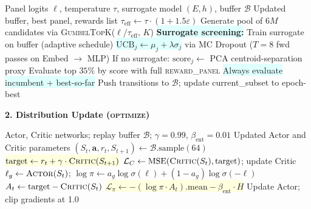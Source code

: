 \documentclass[8pt]{article}
\begin{document}
\begin{tcolorbox}[
    title={\textbf{Algorithm 1c:} Optimize Best --- Gumbel-TopK + neural surrogate racing},
    colback=lightcyan!30, colframe=addedB!70, fonttitle=\small\bfseries,
    boxrule=0.5pt, arc=2pt, left=4pt, right=4pt, top=2pt, bottom=2pt
]
\begin{algorithmic}[1]
\small
\Require Panel logits $\boldsymbol{\ell}$, temperature $\tau$, surrogate model $(E, h)$, buffer $\mathcal{B}$
\Ensure Updated buffer, best panel, rewards list
\State $\tau_\text{eff} \gets \tau \cdot (1 + 1.5\varepsilon)$ 
\State Generate pool of $6M$ candidates via \textsc{GumbelTopK}($\boldsymbol{\ell}/\tau_\text{eff}$, $K$)
\State \colorbox{lightcyan}{\textbf{Surrogate screening:}} Train surrogate on buffer (adaptive schedule)
\State \colorbox{lightcyan}{$\text{UCB}_j \gets \mu_j + \lambda\sigma_j$} via MC Dropout ($T{=}8$ fwd passes on Embed $\to$ MLP)
\State If no surrogate: $\text{score}_j \gets$ PCA centroid-separation proxy
\State Evaluate top $35\%$ by score with full \textsc{reward\_panel}
\State \colorbox{lightcyan}{Always evaluate incumbent + best-so-far} 
\State Push transitions to $\mathcal{B}$; update current\_subset to epoch-best
\end{algorithmic}
\end{tcolorbox}

\newpage

{\large\bfseries 2. Distribution Update (\textsc{optimize})}

\vspace{3pt}

\begin{tcolorbox}[
    title={\textbf{Algorithm 2a:} Original RL --- Actor-Critic policy gradient + TD(0)},
    colback=white, colframe=black!60, fonttitle=\small\bfseries,
    boxrule=0.5pt, arc=2pt, left=4pt, right=4pt, top=2pt, bottom=2pt
]
\begin{algorithmic}[1]
\small
\Require Actor, Critic networks; replay buffer $\mathcal{B}$; $\gamma = 0.99$, $\beta_\text{ent} = 0.01$
\Ensure Updated Actor and Critic parameters
    \State $(S_t, \mathbf{a}, r_t, S_{t+1}) \gets \mathcal{B}.\text{sample}(64)$
    \State \colorbox{lightyellow}{$\text{target} \gets r_t + \gamma \cdot \textsc{Critic}(S_{t+1})$} \Comment{\textcolor{removed}{TD bootstrap: critic estimates own target}}
    \State $\mathcal{L}_C \gets \text{MSE}(\textsc{Critic}(S_t), \text{target})$; \quad update Critic
    \State $\ell_g \gets \textsc{Actor}(S_t)$; \quad $\log\pi \gets a_g \log\sigma(\ell) + (1{-}a_g)\log\sigma({-}\ell)$
    \State $A_t \gets \text{target} - \textsc{Critic}(S_t)$
    \State \colorbox{lightyellow}{$\mathcal{L}_\pi \gets -(\log\pi \cdot A_t).\text{mean} - \beta_\text{ent} \cdot H$} \Comment{\textcolor{removed}{Per-gene Bernoulli PG}}
    \State Update Actor; clip gradients at 1.0
\EndFor
\end{algorithmic}
\end{tcolorbox}
\end{document}

